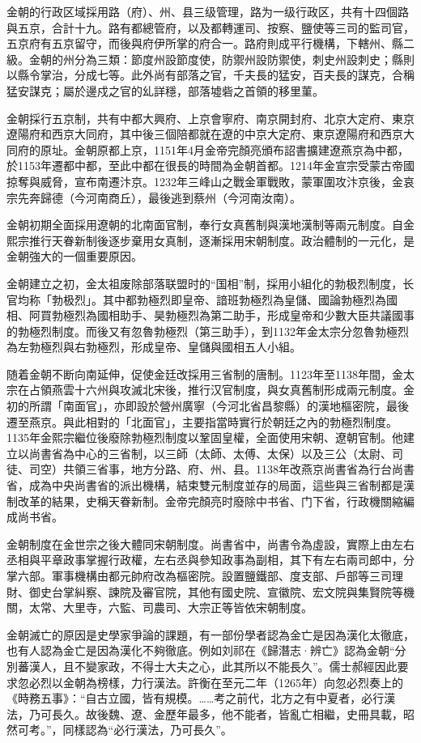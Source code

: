 金朝的行政区域採用路（府）、州、县三级管理，路为一级行政区，共有十四個路與五京，合計十九。路有都總管府，以及都轉運司、按察、鹽使等三司的監司官，五京府有五京留守，而後與府伊所掌的府合一。路府則成平行機構，下轄州、縣二級。金朝的州分為三類：節度州設節度使，防禦州設防禦使，刺史州設刺史；縣則以縣令掌治，分成七等。此外尚有部落之官，千夫長的猛安，百夫長的謀克，合稱猛安謀克；屬於邊戍之官的乣詳穩，部落墟砦之首領的移里菫。

金朝採行五京制，共有中都大興府、上京會寧府、南京開封府、北京大定府、東京遼陽府和西京大同府，其中後三個陪都就在遼的中京大定府、東京遼陽府和西京大同府的原址。金朝原都上京，1151年4月金帝完顏亮頒布詔書擴建遼燕京為中都，於1153年遷都中都，至此中都在很長的時間為金朝首都。1214年金宣宗受蒙古帝國掠奪與威脅，宣布南遷汴京。1232年三峰山之戰金軍戰敗，蒙軍圍攻汴京後，金哀宗先奔歸德（今河南商丘），最後逃到蔡州（今河南汝南）。

金朝初期全面採用遼朝的北南面官制，奉行女真舊制與漢地漢制等兩元制度。自金熙宗推行天眷新制後逐步棄用女真制，逐漸採用宋朝制度。政治體制的一元化，是金朝強大的一個重要原因。

金朝建立之初，金太祖废除部落联盟时的“国相”制，採用小組化的勃极烈制度，长官均称「勃极烈」。其中都勃極烈即皇帝、諳班勃極烈為皇儲、國論勃極烈為國相、阿買勃極烈為國相助手、昊勃極烈為第二助手，形成皇帝和少數大臣共議國事的勃極烈制度。而後又有忽魯勃極烈（第三助手），到1132年金太宗分忽魯勃極烈為左勃極烈與右勃極烈，形成皇帝、皇儲與國相五人小組。

随着金朝不断向南延伸，促使金廷改採用三省制的唐制。1123年至1138年間，金太宗在占領燕雲十六州與攻滅北宋後，推行汉官制度，與女真舊制形成兩元制度。金初的所謂「南面官」，亦即設於營州廣寧（今河北省昌黎縣）的漢地樞密院，最後遷至燕京。與此相對的「北面官」，主要指當時實行於朝廷之內的勃極烈制度。1135年金熙宗繼位後廢除勃極烈制度以鞏固皇權，全面使用宋朝、遼朝官制。他建立以尚書省為中心的三省制，以三師（太師、太傅、太保）以及三公（太尉、司徒、司空）共領三省事，地方分路、府、州、县。1138年改燕京尚書省為行台尚書省，成為中央尚書省的派出機構，結束雙元制度並存的局面，這些與三省制都是漢制改革的結果，史稱天眷新制。金帝完顏亮时廢除中书省、门下省，行政機關縮編成尚书省。

金朝制度在金世宗之後大體同宋朝制度。尚書省中，尚書令為虛設，實際上由左右丞相與平章政事掌握行政權，左右丞與參知政事為副相，其下有左右兩司郎中，分掌六部。軍事機構由都元帥府改為樞密院。設置鹽鐵部、度支部、戶部等三司理財、御史台掌糾察、諫院及審官院，其他有國史院、宣徽院、宏文院與集賢院等機關，太常、大里寺，六監、司農司、大宗正等皆依宋朝制度。

金朝滅亡的原因是史學家爭論的課題，有一部份學者認為金亡是因為漢化太徹底，也有人認為金亡是因為漢化不夠徹底。例如刘祁在《歸潛志·辨亡》認為金朝“分別蕃漢人，且不變家政，不得士大夫之心，此其所以不能長久”。儒士郝經因此要求忽必烈以金朝為榜樣，力行漢法。許衡在至元二年（1265年）向忽必烈奏上的《時務五事》：“自古立國，皆有規模。……考之前代，北方之有中夏者，必行漢法，乃可長久。故後魏、遼、金歷年最多，他不能者，皆亂亡相繼，史冊具載，昭然可考。”，同樣認為“必行漢法，乃可長久”。

